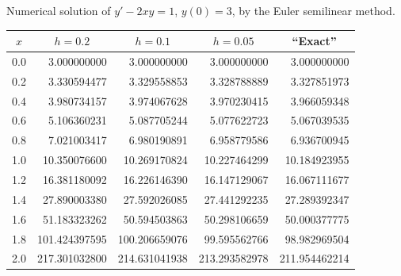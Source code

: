 \begin{examplesolution}
\begin{newtable}
  \label{table:3.1.6} Numerical solution of $y'-2xy=1$, $y(0)=3$, by the Euler semilinear method.
  \begin{center}
    \begin{tabular}{|c|r|r|r|r|}
      \hline
      \multicolumn{1}{|c|}{$x$} & \multicolumn{1}{|c|}{$h=0.2$} & \multicolumn{1}{|c|}{$h=0.1$} & \multicolumn{1}{|c|}{$h=0.05$} & \multicolumn{1}{|c|}{``Exact''} \\
      \hline
      0.0                       & 3.000000000                   & 3.000000000                   & 3.000000000                    & 3.000000000                     \\
      0.2                       & 3.330594477                   & 3.329558853                   & 3.328788889                    & 3.327851973                     \\
      0.4                       & 3.980734157                   & 3.974067628                   & 3.970230415                    & 3.966059348                     \\
      0.6                       & 5.106360231                   & 5.087705244                   & 5.077622723                    & 5.067039535                     \\
      0.8                       & 7.021003417                   & 6.980190891                   & 6.958779586                    & 6.936700945                     \\
      1.0                       & 10.350076600                  & 10.269170824                  & 10.227464299                   & 10.184923955                    \\
      1.2                       & 16.381180092                  & 16.226146390                  & 16.147129067                   & 16.067111677                    \\
      1.4                       & 27.890003380                  & 27.592026085                  & 27.441292235                   & 27.289392347                    \\
      1.6                       & 51.183323262                  & 50.594503863                  & 50.298106659                   & 50.000377775                    \\
      1.8                       & 101.424397595                 & 100.206659076                 & 99.595562766                   & 98.982969504                    \\
      2.0                       & 217.301032800                 & 214.631041938                 & 213.293582978                  & 211.954462214                   \\
      \hline
    \end{tabular}
  \end{center}
\end{newtable}
\end{examplesolution}

